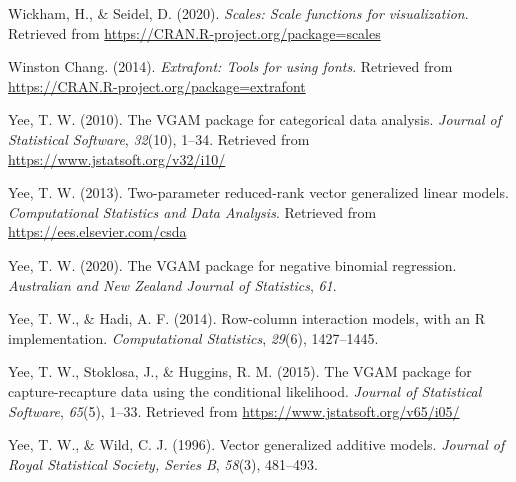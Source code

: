 \documentclass[
  man]{apa6}
\newlength{\cslhangindent}
\newlength{\cslentryspacingunit} %
\newenvironment{CSLReferences}[2] %
 {%
  \setlength{\parindent}{0pt}
  \ifodd #1
  \let\oldpar\par
  \def\par{\hangindent=\cslhangindent\oldpar}
  \fi
  \setlength{\parskip}{#2\cslentryspacingunit}
 }%
 {}
\begin{document}
\begin{CSLReferences}{1}{0}
\leavevmode{}%
Wickham, H., \& Seidel, D. (2020). \emph{Scales: Scale functions for visualization}. Retrieved from \url{https://CRAN.R-project.org/package=scales}

\leavevmode{}%
Winston Chang. (2014). \emph{Extrafont: Tools for using fonts}. Retrieved from \url{https://CRAN.R-project.org/package=extrafont}

\leavevmode{}%
Yee, T. W. (2010). The {VGAM} package for categorical data analysis. \emph{Journal of Statistical Software}, \emph{32}(10), 1--34. Retrieved from \url{https://www.jstatsoft.org/v32/i10/}

\leavevmode{}%
Yee, T. W. (2013). Two-parameter reduced-rank vector generalized linear models. \emph{Computational Statistics and Data Analysis}. Retrieved from \url{https://ees.elsevier.com/csda}

\leavevmode{}%
Yee, T. W. (2020). The {VGAM} package for negative binomial regression. \emph{Australian and New Zealand Journal of Statistics}, \emph{61}.

\leavevmode{}%
Yee, T. W., \& Hadi, A. F. (2014). Row-column interaction models, with an {R} implementation. \emph{Computational Statistics}, \emph{29}(6), 1427--1445.

\leavevmode{}%
Yee, T. W., Stoklosa, J., \& Huggins, R. M. (2015). The {VGAM} package for capture-recapture data using the conditional likelihood. \emph{Journal of Statistical Software}, \emph{65}(5), 1--33. Retrieved from \url{https://www.jstatsoft.org/v65/i05/}

\leavevmode{}%
Yee, T. W., \& Wild, C. J. (1996). Vector generalized additive models. \emph{Journal of Royal Statistical Society, Series B}, \emph{58}(3), 481--493.

\end{CSLReferences}
\end{document}
